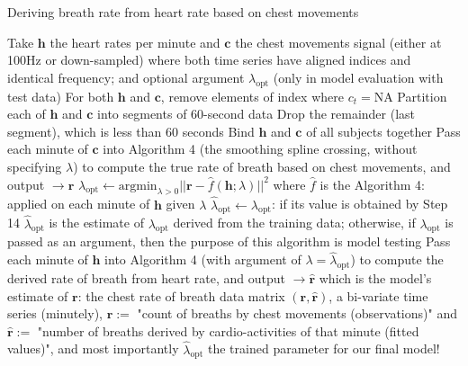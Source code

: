 \documentclass[
]{article}
\begin{document}
\begin{algorithm}
\caption{Deriving breath rate from heart rate based on chest movements}
\begin{algorithmic}[1]
\STATE Take $\mathbf{h}$ the heart rates per minute and $\mathbf{c}$ the chest movements signal (either at 100Hz or down-sampled) where both time series have aligned indices and identical frequency; and optional argument $\lambda_\text{opt}$ (only in model evaluation with test data)
\STATE For both $\mathbf{h}$ and $\mathbf{c}$, remove elements of index where $c_t = \text{NA}$
\STATE Partition each of $\mathbf{h}$ and $\mathbf{c}$ into segments of 60-second data
\ENDFOR
\STATE Drop the remainder (last segment), which is less than 60 seconds
\STATE Bind $\mathbf{h}$ and $\mathbf{c}$ of all subjects together
\ENDIF
{}
\STATE Pass each minute of $\mathbf{c}$ into Algorithm 4 (the smoothing spline crossing, without specifying $\lambda$) to compute the true rate of breath based on chest movements, and output $\rightarrow \mathbf{r}$
\ENDFOR
{}
\STATE $\lambda_\text{opt} \leftarrow \text{argmin}_{\lambda > 0} ||\mathbf{r} - \hat{f}(\mathbf{h}; \lambda)||^2$ where $\hat{f}$ is the Algorithm 4: applied on each minute of $\mathbf{h}$ given $\lambda$
\ENDIF
\STATE $\hat{\lambda}_\text{opt} \leftarrow \lambda_\text{opt}$: if its value is obtained by Step 14 $\hat{\lambda}_\text{opt}$ is the estimate of $\lambda_\text{opt}$ derived from the training data; otherwise, if $\lambda_\text{opt}$ is passed as an argument, then the purpose of this algorithm is model testing
\STATE Pass each minute of $\mathbf{h}$ into Algorithm 4 (with argument of $\lambda = \hat{\lambda}_\text{opt}$) to compute the derived rate of breath from heart rate, and output $\rightarrow \mathbf{\hat{r}}$ which is the model's estimate of $\mathbf{r}$: the chest rate of breath
\ENDFOR
\RETURN data matrix $(\mathbf{r}, \mathbf{\hat{r}})$, a bi-variate time series (minutely), $\mathbf{r} :=$ "count of breaths by chest movements (observations)" and $\mathbf{\hat{r}} :=$ "number of breaths derived by cardio-activities of that minute (fitted values)", and most importantly $\hat{\lambda}_\text{opt}$ the trained parameter for our final model!
\end{algorithmic}
\end{algorithm}
\end{document}
